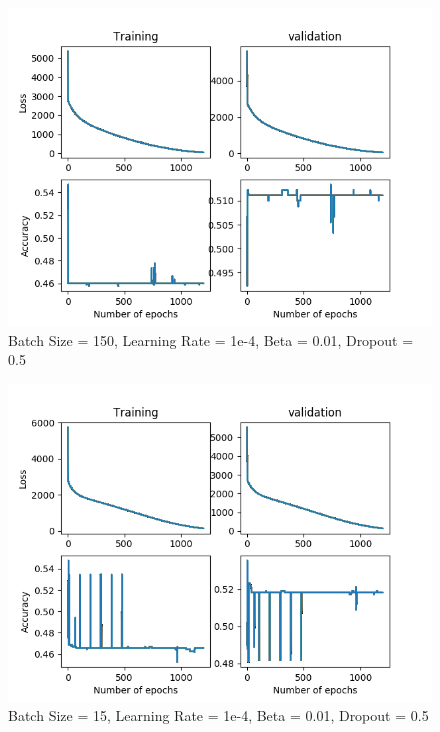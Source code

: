 \documentclass[12pt,reqno]{amsart}
\numberwithin{equation}{section}
\begin{document}
\begin{enumerate}
\begin{figure}[H]
\centering
\includegraphics[scale=0.6]{data12-1e-4-150-1e-2-5e-1}
\caption{Batch Size = 150, Learning Rate = 1e-4, Beta = 0.01, Dropout = 0.5}
\end{figure}

\begin{figure}[H]
\centering
\includegraphics[scale=0.6]{data12-1e-4-15-1e-2-5e-1}
\caption{Batch Size = 15, Learning Rate = 1e-4, Beta = 0.01, Dropout = 0.5}
\end{figure}


\end{enumerate}
\end{document}
